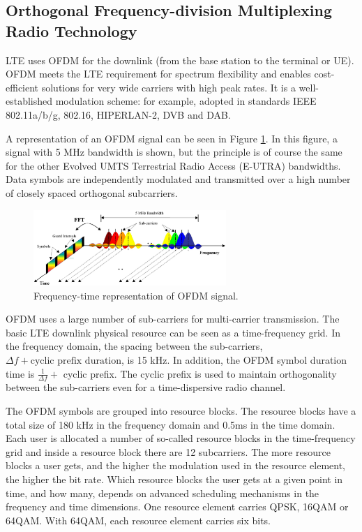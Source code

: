 \subsection{Orthogonal Frequency-division Multiplexing Radio Technology} %

LTE uses OFDM for the downlink (from the base station to the terminal or UE).
OFDM meets the LTE requirement for spectrum flexibility and enables
cost-efficient solutions for very wide carriers with high peak rates. It is a
well-established modulation scheme: for example, adopted in standards IEEE
802.11a/b/g, 802.16, HIPERLAN-2, DVB and DAB.

A representation of an OFDM signal can be seen in Figure \ref{fig:ofdmfreq}. In
this figure, a signal with 5 MHz bandwidth is shown, but the principle is of
course the same for the other Evolved UMTS Terrestrial Radio Access (E-UTRA)
bandwidths. Data symbols are independently modulated and transmitted over a high
number of closely spaced orthogonal subcarriers.

\begin{figure}[htbp]
    \centering
    \includegraphics[width=0.65\textwidth]{./figures/ofdm_frequency}
    \caption{ Frequency-time representation of OFDM signal.
    \label{fig:ofdmfreq}}
\end{figure}

OFDM uses a large number of sub-carriers for multi-carrier transmission. The
basic LTE downlink physical resource can be seen as a time-frequency grid. In
the frequency domain, the spacing between the sub-carriers, $\Delta f +
\text{cyclic prefix duration}$, is 15 kHz. In addition, the OFDM symbol duration
time is $\frac{1}{\Delta f} +$ cyclic prefix. The cyclic prefix is used to
maintain orthogonality between the sub-carriers even for a time-dispersive radio
channel.

The OFDM symbols are grouped into resource blocks. The resource blocks have a
total size of 180 kHz in the frequency domain and 0.5ms in the time domain. Each
user is allocated a number of so-called resource blocks in the time-frequency
grid and inside a resource block there are 12 subcarriers. The more resource
blocks a user gets, and the higher the modulation used in the resource element,
the higher the bit rate. Which resource blocks the user gets at a given point in
time, and how many, depends on advanced scheduling mechanisms in the frequency
and time dimensions. One resource element carries QPSK, 16QAM or 64QAM. With
64QAM, each resource element carries six bits.

